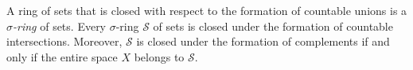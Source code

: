 A ring of sets that is closed with respect to the formation of countable unions is a \textit{$\sigma$-ring} of sets. Every $\sigma$-ring $\mathcal{S}$ of sets is closed under the formation of countable intersections. Moreover, $\mathcal{S}$ is closed under the formation of complements if and only if the entire space $X$ belongs to $\mathcal{S}$.
